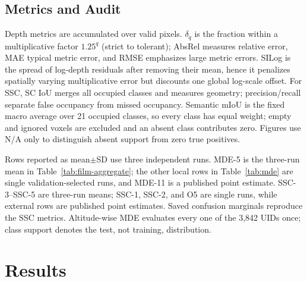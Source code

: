 \subsection{Metrics and Audit}
Depth metrics are accumulated over valid pixels. $\delta_q$ is the fraction within a multiplicative factor $1.25^q$ (strict to tolerant); AbsRel measures relative error, MAE typical metric error, and RMSE emphasizes large metric errors. SILog is the spread of log-depth residuals after removing their mean, hence it penalizes spatially varying multiplicative error but discounts one global log-scale offset. For SSC, SC IoU merges all occupied classes and measures geometry; precision/recall separate false occupancy from missed occupancy. Semantic mIoU is the fixed macro average over 21 occupied classes, so every class has equal weight; empty and ignored voxels are excluded and an absent class contributes zero. Figures use N/A only to distinguish absent support from zero true positives.

Rows reported as mean$\pm$SD use three independent runs. MDE-5 is the three-run mean in Table~\ref{tab:film-aggregate}; the other local rows in Table~\ref{tab:mde} are single validation-selected runs, and MDE-11 is a published point estimate. SSC-3--SSC-5 are three-run means; SSC-1, SSC-2, and O5 are single runs, while external rows are published point estimates. Saved confusion marginals reproduce the SSC metrics. Altitude-wise MDE evaluates every one of the 3,842 UIDs once; class support denotes the test, not training, distribution.

\section{Results}
\label{sec:results}

